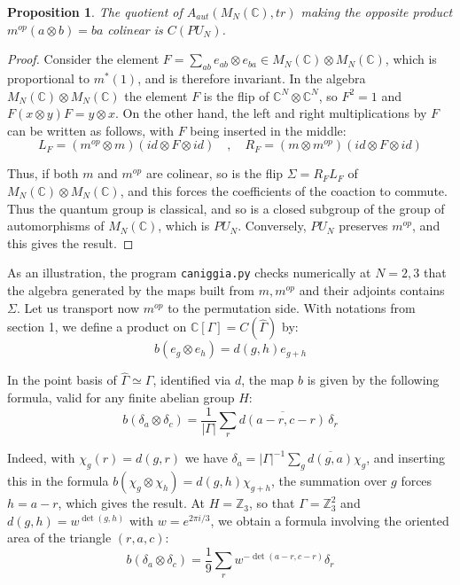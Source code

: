 \documentclass[11pt]{amsart}
\newtheorem{proposition}[theorem]{Proposition}
\theoremstyle{definition}
\begin{document}
\begin{proposition}
The quotient of $A_{aut}(M_N(\mathbb C),tr)$ making the opposite product $m^{op}(a\otimes b)=ba$ colinear is $C(PU_N)$.
\end{proposition}

\begin{proof}
Consider the element $F=\sum_{ab}e_{ab}\otimes e_{ba}\in M_N(\mathbb C)\otimes M_N(\mathbb C)$, which is proportional to $m^*(1)$, and is therefore invariant. In the algebra $M_N(\mathbb C)\otimes M_N(\mathbb C)$ the element $F$ is the flip of $\mathbb C^N\otimes\mathbb C^N$, so $F^2=1$ and $F(x\otimes y)F=y\otimes x$. On the other hand, the left and right multiplications by $F$ can be written as follows, with $F$ being inserted in the middle:
$$L_F=(m^{op}\otimes m)(id\otimes F\otimes id)\quad,\quad R_F=(m\otimes m^{op})(id\otimes F\otimes id)$$

Thus, if both $m$ and $m^{op}$ are colinear, so is the flip $\Sigma=R_FL_F$ of $M_N(\mathbb C)\otimes M_N(\mathbb C)$, and this forces the coefficients of the coaction to commute. Thus the quantum group is classical, and so is a closed subgroup of the group of automorphisms of $M_N(\mathbb C)$, which is $PU_N$. Conversely, $PU_N$ preserves $m^{op}$, and this gives the result.
\end{proof}

As an illustration, the program {\tt caniggia.py} checks numerically at $N=2,3$ that the algebra generated by the maps built from $m,m^{op}$ and their adjoints contains $\Sigma$. Let us transport now $m^{op}$ to the permutation side. With notations from section 1, we define a product on $\mathbb C[\Gamma]=C(\widehat{\Gamma})$ by:
$$b(e_g\otimes e_h)=d(g,h)e_{g+h}$$

In the point basis of $\widehat{\Gamma}\simeq\Gamma$, identified via $d$, the map $b$ is given by the following formula, valid for any finite abelian group $H$:
$$b(\delta_a\otimes\delta_c)=\frac{1}{|\Gamma|}\sum_r\overline{d(a-r,c-r)}\,\delta_r$$

Indeed, with $\chi_g(r)=d(g,r)$ we have $\delta_a=|\Gamma|^{-1}\sum_g\overline{d(g,a)}\chi_g$, and inserting this in the formula $b(\chi_g\otimes\chi_h)=d(g,h)\chi_{g+h}$, the summation over $g$ forces $h=a-r$, which gives the result. At $H=\mathbb Z_3$, so that $\Gamma=\mathbb Z_3^2$ and $d(g,h)=w^{\det(g,h)}$ with $w=e^{2\pi i/3}$, we obtain a formula involving the oriented area of the triangle $(r,a,c)$:
$$b(\delta_a\otimes\delta_c)=\frac{1}{9}\sum_rw^{-\det(a-r,c-r)}\delta_r$$
\end{document}
